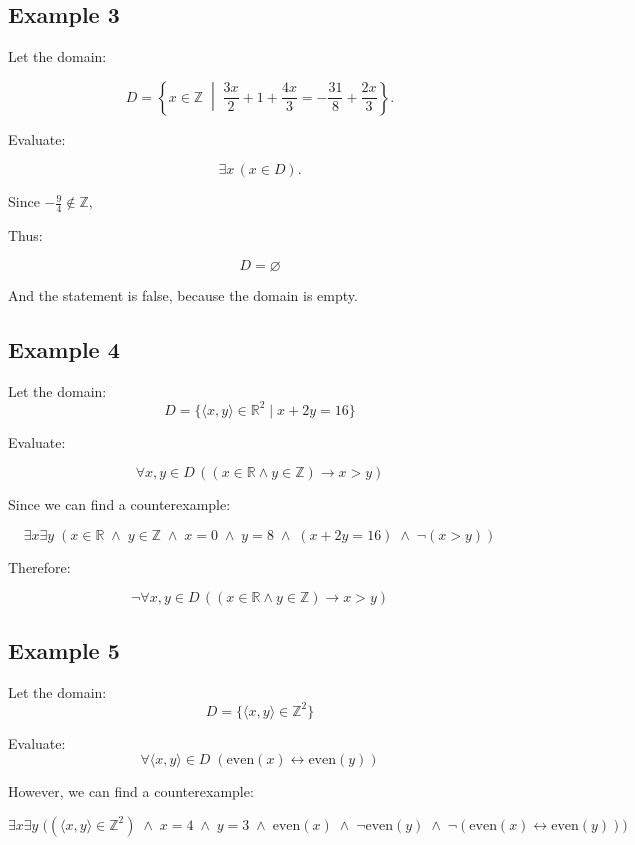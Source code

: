 \documentclass[12pt,a4paper,openany]{article}
\begin{document}
\subsection{Example 3}\label{example-3}

Let the domain:

\[
D = \displaystyle\left\{ x \in \mathbb{Z} \;\middle|\; \frac{3x}{2} + 1 + \frac{4x}{3} = -\frac{31}{8} + \frac{2x}{3} \right\}.
\]

Evaluate:

\[
\exists x \,(x \in D).
\]

Since \(-\tfrac{9}{4} \notin \mathbb{Z}\),

Thus:

\[
\boxed{D = \varnothing}
\]

And the statement is false, because the domain is empty.

\subsection{Example 4}\label{example-4}

Let the domain:
\[D = \{\langle x,y \rangle \in \mathbb{R}^2 \mid x + 2y = 16\} \]

Evaluate:

\[ \forall  x, y \in D \, ((x \in \mathbb{R} \land y \in \mathbb{Z}) \to x > y) \]

Since we can find a counterexample:

\[\exists x \exists y \;(x \in \mathbb{R} \;\land\; y \in \mathbb{Z} \;\land\; x = 0 \;\land\; y = 8 \;\land\; (x + 2y = 16) \;\land\; \neg(x > y))\]

Therefore:

\[\boxed{\neg \forall x, y \in D \, ((x \in \mathbb{R} \land y \in \mathbb{Z}) \to x > y)}\]

\subsection{Example 5}\label{example-5}

Let the domain: \[D = \{\langle x,y \rangle \in \mathbb{Z}^2\}\]

Evaluate:
\[\forall \langle x,y \rangle \in D \;(\text{even}(x) \leftrightarrow \text{even}(y))\]

However, we can find a counterexample:

\[
\exists x \exists y \;\big((\langle x, y \rangle \in \mathbb{Z}^2) \;\land\; x = 4 \;\land\; y = 3 \;\land\; \text{even}(x) \;\land\; \neg\text{even}(y) \;\land\; \neg(\text{even}(x) \leftrightarrow \text{even}(y))\big)
\]
\end{document}
